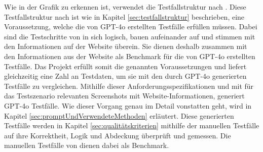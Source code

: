 \documentclass[12pt,toc=bib,toc=listof]{scrreprt}
\begin{document}
\noindent Wie in der Grafik zu erkennen ist, verwendet \textcite{Pavankumar21github2022} die Testfallstruktur nach \textcite{IsoIecIeee2024}. Diese Testfallstruktur nach \textcite{IsoIecIeee2024} ist wie in Kapitel \ref{sec:testfallstruktur} beschrieben, eine Voraussetzung, welche die von GPT-4o erstellten Testfälle erfüllen müssen. Dabei sind die Testschritte von \textcite{Pavankumar21github2022} in sich logisch, bauen aufeinander auf und stimmen mit den Informationen auf der \textcite{OpenCart2025} Website überein. Sie dienen deshalb zusammen mit den Informationen aus der \textcite{OpenCart2025} Website als Benchmark für die von GPT-4o erstellten Testfälle. Das Projekt erfüllt somit die genannten Voraussetzungen und liefert gleichzeitig eine Zahl an Testdaten, um sie mit den durch GPT-4o generierten Testfälle zu vergleichen. Mithilfe dieser Anforderungsspezifikationen und mit für das Testszenario relevanten Screenshots mit Website-Informationen, generiert GPT-4o Testfälle. Wie dieser Vorgang genau im Detail vonstatten geht, wird in Kapitel \ref{sec:promptUndVerwendeteMethoden} erläutert. Diese generierten Testfälle werden in Kapitel \ref{sec:qualitätskriterien} mithilfe der manuellen Testfälle auf ihre Korrektheit, Logik und Abdeckung überprüft und gemessen. Die manuellen Testfälle von \textcite{Pavankumar21github2022} dienen dabei als Benchmark.
\newpage
\end{document}
